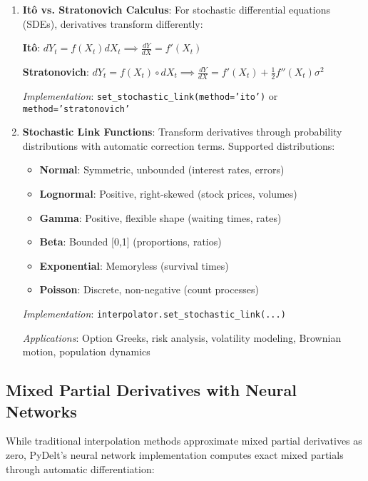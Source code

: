 \documentclass[10pt,journal,compsoc]{IEEEtran}
\begin{document}
\begin{enumerate}
    \item \textbf{Itô vs. Stratonovich Calculus}: For stochastic differential equations (SDEs), derivatives transform differently:
    
    \textbf{Itô}: $dY_t = f(X_t)dX_t \implies \frac{dY}{dX} = f'(X_t)$
    
    \textbf{Stratonovich}: $dY_t = f(X_t) \circ dX_t \implies \frac{dY}{dX} = f'(X_t) + \frac{1}{2}f''(X_t)\sigma^2$
    
    
    \textit{Implementation}: \texttt{set\_stochastic\_link(method='ito')} or \texttt{method='stratonovich'}
    
    \item \textbf{Stochastic Link Functions}: Transform derivatives through probability distributions with automatic correction terms. Supported distributions:
    
    \begin{itemize}
        \item \textbf{Normal}: Symmetric, unbounded (interest rates, errors)
        \item \textbf{Lognormal}: Positive, right-skewed (stock prices, volumes)
        \item \textbf{Gamma}: Positive, flexible shape (waiting times, rates)
        \item \textbf{Beta}: Bounded [0,1] (proportions, ratios)
        \item \textbf{Exponential}: Memoryless (survival times)
        \item \textbf{Poisson}: Discrete, non-negative (count processes)
    \end{itemize}
    
    
    \textit{Implementation}: \texttt{interpolator.set\_stochastic\_link(...)}
    
    \textit{Applications}: Option Greeks, risk analysis, volatility modeling, Brownian motion, population dynamics
\end{enumerate}

\subsection{Mixed Partial Derivatives with Neural Networks}

While traditional interpolation methods approximate mixed partial derivatives as zero, PyDelt's neural network implementation computes exact mixed partials through automatic differentiation:
\end{document}
